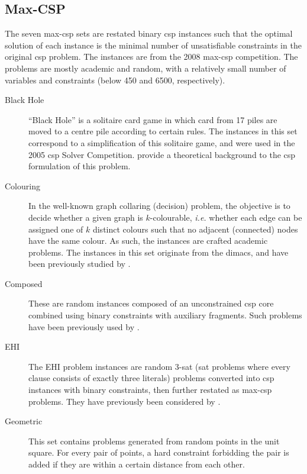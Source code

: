 \subsection{Max-CSP}
The seven max-\gls{csp} sets are restated binary \gls{csp} instances such that the optimal solution of each instance is the minimal number of unsatisfiable constraints in the original \gls{csp} problem.
The instances are from the 2008 max-\gls{csp} competition.
The problems are mostly academic and random, with a relatively small number of variables and constraints (below \num{450} and \num{6500}, respectively).

\begin{description}
	\item[Black Hole]
		\enquote{Black Hole} is a solitaire card game in which card from 17 piles are moved to a centre pile according to certain rules.
		The instances in this set correspond to a simplification of this solitaire game, and were used in the 2005 \gls{csp} Solver Competition.
		\Textcite{Gent07} provide a theoretical background to the \gls{csp} formulation of this problem.
	\item[Colouring]
		In the well-known graph collaring (decision) problem, the objective is to decide whether a given graph is \(k\)-colourable, \emph{i.e.} whether each edge can be assigned one of \(k\) distinct colours such that no adjacent (connected) nodes have the same colour.
		As such, the instances are crafted academic problems.
		The instances in this set originate from the \gls{dimacs}, and have been previously studied by \textcite{Benhamou07}.
	\item[Composed]
		These are random instances composed of an unconstrained \gls{csp} core combined using binary constraints with auxiliary fragments.
		Such problems have been previously used by \textcite{Lecoutre04,Jussien00}.
	\item[EHI]
		The EHI problem instances are random 3-\gls{sat} (\gls{sat} problems where every clause consists of exactly three literals) problems converted into \gls{csp} instances with binary constraints, then further restated as max-\gls{csp} problems. They have previously been considered by \textcite{Lecoutre04}.
	\item[Geometric]
		This set contains problems generated from random points in the unit square. For every pair of points, a hard constraint forbidding the pair is added if they are within a certain distance from each other.

\end{description}
